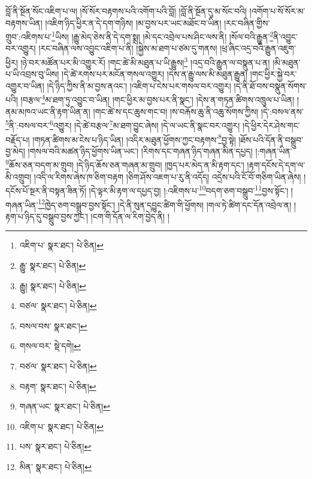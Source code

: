 བློ་ནི་སྔོན་སོང་འཇིག་པ་ལ། །སོ་སོར་བརྟགས་པའི་འགོག་པའི་བློ། །བློ་ནི་སྔོན་དུ་མ་སོང་བའི། །འགོག་པ་སོ་སོར་མ་བརྟགས་ཡིན། །འཇིག་ཉིད་ཕྱིར་ན་དེ་དག་གཉིས། །མ་བྱས་པར་ཡང་མཐོང་བ་ཡིན། །རང་བཞིན་གྱིས་གྲུབ་:འཇིགས་པ་\footnote{འཇིག་པ་  སྣར་ཐང་།  པེ་ཅིན། }ཡིས། །རྒྱུ་མེད་ཅེས་ནི་དེ་དག་སྨྲ། །མེ་དང་འབྲེལ་པས་ཤིང་ལས་ནི། །སོལ་བའི་རྒྱུན་\footnote{རྒྱུ་  སྣར་ཐང་།  པེ་ཅིན། }ནི་འབྱུང་བར་འགྱུར། །རང་བཞིན་ལས་འབྱུང་འཇིག་པ་ནི། །སྐྱེས་མ་ཐག་པ་ཙམ་དུ་གནས། །ཕྲ་ཞིང་འདྲ་བའི་རྒྱུན་འཇུག་ཕྱིར། །ཉེ་བར་མཚོན་པར་མི་འགྱུར་རོ། །གང་ཚེ་མི་མཐུན་པ་ཡི་རྒྱུས།\footnote{རྒྱུ།  སྣར་ཐང་།  པེ་ཅིན། } །འདྲ་བའི་རྒྱུན་ལ་བསྣུན་པ་ན། །མི་མཐུན་པ་ཡི་འབྲས་བུ་ཡིས། །དེ་ཚེ་རགས་པར་མངོན་གསལ་འགྱུར། །དེས་ན་རྒྱུ་ལས་མི་མཐུན་རྒྱུན། །གང་ཕྱིར་སྐྱེ་བར་འགྱུར་བ་ཡིན། །དེ་ཉིད་ཀྱིས་ནི་མ་བྱས་ནའང་། །འཇིག་པ་ངེས་པར་གསལ་བར་འགྱུར། །དེ་ནི་ཐོ་བས་བསྣུན་སོགས་པའི། །བརྩལ་\footnote{བཙལ་  སྣར་ཐང་།  པེ་ཅིན། }མ་ཐག་ཏུ་འབྱུང་བ་ཡིན། །གང་ཕྱིར་མ་བྱས་པར་ནི་སྣང་། །དེས་ན་གཏན་ཚིགས་འཁྲུལ་པ་ཡིན། །ནམ་མཁའ་ཡང་ནི་རྟག་ཡིན་ན། །གང་ཚེ་ས་དང་ཆུས་གང་བ། །ས་བརྐོས་ཆུ་ནི་འཆུ་སོགས་ཀྱིས། །དེ་:བསལ་ནས་\footnote{བསལ་བས་  སྣར་ཐང་། }ནི་:བསལ་བར་\footnote{གསལ་བར་  སྡེ་དགེ། }འགྱུར། །དེ་ཚེ་བརྩལ་\footnote{བཙལ་  སྣར་ཐང་།  པེ་ཅིན། }མ་ཐག་བྱུང་ཞེས། །དེ་ལ་ཡང་ནི་སྣང་བར་འགྱུར། །དེ་ཕྱིར་དེར་ཤེས་གང་བརྗོད་པ། །གཏན་ཚིགས་མ་ངེས་པ་ཉིད་ཡིན། །འདིར་མཐུན་ཕྱོགས་ཀྱང་བརྟགས་\footnote{བརྟག་  སྣར་ཐང་།  པེ་ཅིན། }བྱ་སྟེ། །ཐོས་པའི་དོན་ནི་བསྒྲུབ་བྱ་མེད། །གསལ་བའི་མཚན་ཉིད་ཕྱོགས་ཡིན་ཡང་། །རིགས་དང་གཞན་ཉིད་གཞན་མིན་དཔྱད། །:གཞན་ཡིན་\footnote{གཞན་ཡང་  སྣར་ཐང་།  པེ་ཅིན། }ཆོས་ཅན་བདག་མ་གྲུབ། །དེ་ཉིད་ཆོས་ཅན་གཞན་མ་གྲུབ། །ཁྱད་པར་མེད་ན་མི་རྟག་དང་། །རྟག་དངོས་དེ་དག་ལ་མི་འགྲུབ། །འདི་ལ་རིགས་ཞེས་ཁ་ཅིག་བརྟག །ཅིག་ཤོས་འཇག་པ་རུ་ནི་འདོད། འདྲེས་པའི་ངོ་བོ་གཅིག་ཡིན་ཞེས། །དངོས་པོ་སྔར་ནི་བསྟན་ཟིན་ཏོ། །དེ་ལྟར་མི་རྟག་ལ་དཔྱད་བྱ། །:འཇིགས་པ་\footnote{འཇིག་པ་  སྣར་ཐང་།  པེ་ཅིན། }བདག་ཅག་བསྒྲུབ་\footnote{པས་  སྣར་ཐང་།  པེ་ཅིན། }བྱས་སྟོང་། །གཞན་ཡིན་\footnote{མིན་  སྣར་ཐང་།  པེ་ཅིན། }ཁྱེད་ཅག་བསྒྲུབ་བྱས་སྟོང་། །དེ་ནི་སུན་དབྱུང་ཚིག་གི་ཕྱོགས། །གལ་ཏེ་ཚིག་དང་དོན་འབྲེལ་ན། །རྟག་པ་ཉིད་དུ་བསྒྲུབ་བྱས་ཀྱང་། །ངག་གི་དོན་ལ་རིག་བྱེད་ནི། །
